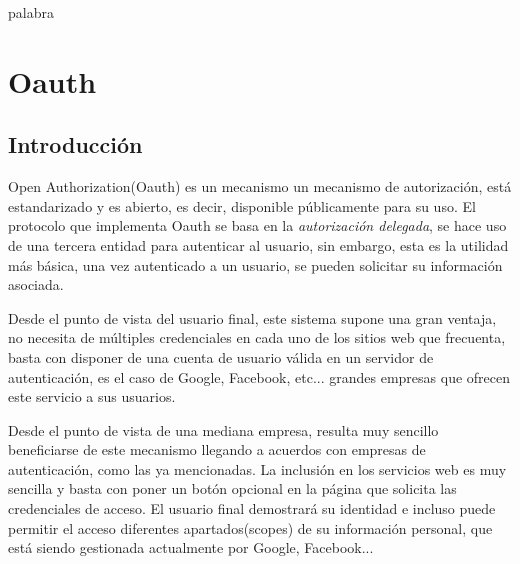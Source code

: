 \documentclass[a4,12pt,onecolum]{article}
\begin{document}

\thispagestyle{empty}
\textcolor[rgb]{1.00,1.00,1.00}{palabra} %
\newpage

\setcounter{page}{3}


\newpage
\tableofcontents 		%
\newpage





\clearpage
\section{Oauth}

\subsection{Introducción}
Open Authorization(Oauth) es un mecanismo un mecanismo de autorización, está estandarizado y es abierto, es decir, disponible públicamente para su uso. El protocolo que implementa Oauth se basa en la \emph{autorización delegada}, se hace uso de una tercera entidad para autenticar al usuario, sin embargo, esta es la utilidad más básica, una vez autenticado a un usuario, se pueden solicitar su información asociada.

Desde el punto de vista del usuario final, este sistema supone una gran ventaja, no necesita de múltiples credenciales en cada uno de los sitios web que frecuenta, basta con disponer de una cuenta de usuario válida en un servidor de autenticación, es el caso de Google, Facebook, etc... grandes empresas que ofrecen este servicio a sus usuarios.

Desde el punto de vista de una mediana empresa, resulta muy sencillo beneficiarse de este mecanismo llegando a acuerdos con empresas de autenticación, como las ya mencionadas. La inclusión en los servicios web es muy sencilla y basta con poner un botón opcional en la página que solicita las credenciales de acceso. El usuario final demostrará su identidad e incluso puede permitir el acceso diferentes apartados(scopes) de su información personal, que está siendo gestionada actualmente por Google, Facebook...
\end{document}
